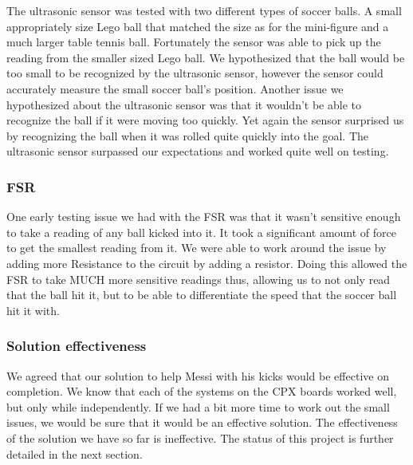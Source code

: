 \documentclass[12pt]{article}
\begin{document}
The ultrasonic sensor was tested with two different types of soccer balls. A small appropriately size Lego ball that matched the size as for the mini-figure and a much larger table tennis ball. Fortunately the sensor was able to pick up the reading from the smaller sized Lego ball. We hypothesized that the ball would be too small to be recognized by the ultrasonic sensor, however the sensor could accurately measure the small soccer ball's position. Another issue we hypothesized about the ultrasonic sensor was that it wouldn't be able to recognize the ball if it were moving too quickly. Yet again the sensor surprised us by recognizing the ball when it was rolled quite quickly into the goal. The ultrasonic sensor surpassed our expectations and worked quite well on testing.  

\subsubsection{FSR}

One early testing issue we had with the FSR was that it wasn't sensitive enough to take a reading of any ball kicked into it. It took a significant amount of force to get the smallest reading from it. We were able to work around the issue by adding more Resistance to the circuit by adding a resistor. Doing this allowed the FSR to take MUCH more sensitive readings thus, allowing us to not only read that the ball hit it, but to be able to differentiate the speed that the soccer ball hit it with. 

\subsubsection{Solution effectiveness}

We agreed that our solution to help Messi with his kicks would be effective on completion. We know that each of the systems on the CPX boards worked well, but only while independently. If we had a bit more time to work out the small issues, we would be sure that it would be an effective solution. The effectiveness of the solution we have so far is ineffective. The status of this project is further detailed in the next section. 

\end{document}
